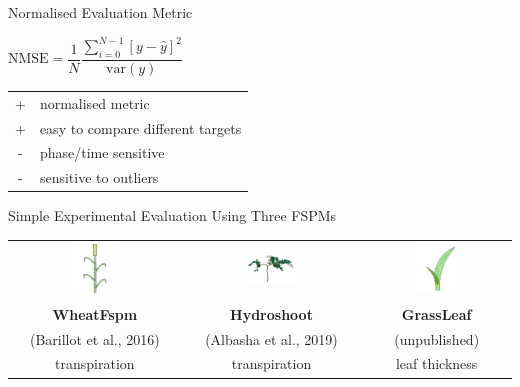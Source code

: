 \documentclass[final,aspectratio=169,12pt]{beamer}
\begin{document}
\begin{frame}{Normalised Evaluation Metric}

$ \text{NMSE} = \dfrac{1}{N}\dfrac{\sum_{i=0}^{N-1}\left[y-\hat{y}\right]^2}{\text{var}(y)} $

\begin{tabular}{cl}
+ & normalised metric \\
+ & easy to compare different targets \\
- & phase/time sensitive \\
- & sensitive to outliers
\end{tabular}

\end{frame}

\begin{frame}{Simple Experimental Evaluation Using Three FSPMs}

\centering
\begin{tabular}{ccc}
\includegraphics[width=0.3\textwidth]{figures/cnwheat} & \includegraphics[width=0.3\textwidth]{figures/hydroshoot} & \includegraphics[width=0.3\textwidth]{figures/GrassLeaf} \\
\textbf{WheatFspm} & \textbf{Hydroshoot} & \textbf{GrassLeaf} \\
{\footnotesize (Barillot et al., 2016)} & {\footnotesize (Albasha et al., 2019)} & {\footnotesize (unpublished)} \\
transpiration & transpiration & leaf thickness \\
\end{tabular}

\end{frame}
\end{document}
